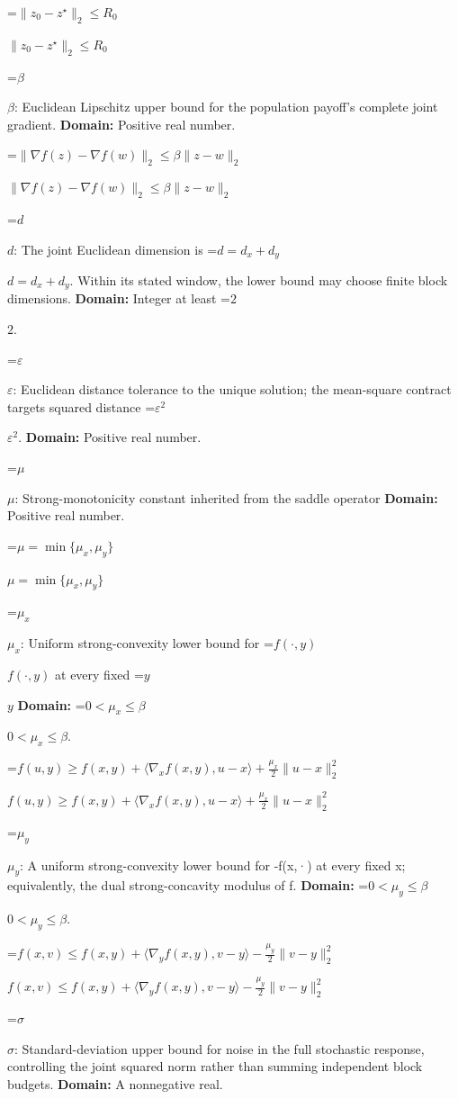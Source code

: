 \documentclass[10pt,a4paper]{article}
\newcommand{\AtlasMath}[1]{\par\begingroup\centering\setbox0=\hbox{$\displaystyle #1$}\ifdim\wd0>1.4\linewidth\typeout{ATLAS WIDE FORMULA: \the\wd0}\fi\ifdim\wd0>\linewidth\resizebox{\linewidth}{!}{\box0}\else\box0\fi\par\endgroup}
\newcommand{\AtlasInlineMath}[1]{\begingroup\setbox0=\hbox{$#1$}\ifdim\wd0>.4\linewidth\endgroup\AtlasMath{#1}\else\endgroup$#1$\fi}
\begin{document}
\AtlasInlineMath{\|z_0-z^\star\|_2\le R_0}



\AtlasInlineMath{\beta}: Euclidean Lipschitz upper bound for the population payoff's complete joint gradient. \textbf{Domain:} Positive real number.



\AtlasInlineMath{\|\nabla f(z)-\nabla f(w)\|_2\le\beta\|z-w\|_2}



\AtlasInlineMath{d}: The joint Euclidean dimension is \AtlasInlineMath{d=d_x+d_y}. Within its stated window, the lower bound may choose finite block dimensions. \textbf{Domain:} Integer at least \AtlasInlineMath{2}.



\AtlasInlineMath{\varepsilon}: Euclidean distance tolerance to the unique solution; the mean-square contract targets squared distance \AtlasInlineMath{\varepsilon^2}. \textbf{Domain:} Positive real number.



\AtlasInlineMath{\mu}: Strong-monotonicity constant inherited from the saddle operator \textbf{Domain:} Positive real number.



\AtlasInlineMath{\mu=\min\{\mu_x,\mu_y\}}



\AtlasInlineMath{\mu_x}: Uniform strong-convexity lower bound for \AtlasInlineMath{f(\cdot,y)} at every fixed \AtlasInlineMath{y} \textbf{Domain:} \AtlasInlineMath{0<\mu_x\le\beta}.



\AtlasInlineMath{f(u,y)\ge f(x,y)+\langle\nabla_xf(x,y),u-x\rangle+\frac{\mu_x}{2}\|u-x\|_2^2}



\AtlasInlineMath{\mu_y}: A uniform strong-convexity lower bound for -f(x,·) at every fixed x; equivalently, the dual strong-concavity modulus of f. \textbf{Domain:} \AtlasInlineMath{0<\mu_y\le\beta}.



\AtlasInlineMath{f(x,v)\le f(x,y)+\langle\nabla_yf(x,y),v-y\rangle-\frac{\mu_y}{2}\|v-y\|_2^2}



\AtlasInlineMath{\sigma}: Standard-deviation upper bound for noise in the full stochastic response, controlling the joint squared norm rather than summing independent block budgets. \textbf{Domain:} A nonnegative real.
\end{document}
